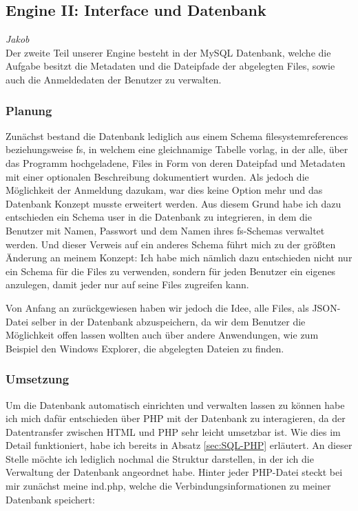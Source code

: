 \documentclass[12pt,a4paper,bibliography=totocnumbered,listof=totocnumbered]{scrartcl}
\begin{document}
\subsection{Engine II: Interface und Datenbank}
\emph{Jakob}\\
\label{sec:EngineII}
Der zweite Teil unserer Engine besteht in der MySQL Datenbank, welche die Aufgabe besitzt die Metadaten und die Dateipfade der abgelegten Files, sowie auch die Anmeldedaten der Benutzer zu verwalten.

\subsubsection{Planung}
\label{sec:EngineIIPlanung}
Zunächst bestand die Datenbank lediglich aus einem Schema \glqq filesystemreferences\grqq{} beziehungsweise \glqq fs\grqq{}, in welchem eine gleichnamige Tabelle vorlag, in der alle, über das Programm hochgeladene, Files in Form von deren Dateipfad und Metadaten mit einer optionalen Beschreibung dokumentiert wurden.
Als jedoch die Möglichkeit der Anmeldung dazukam, war dies keine Option mehr und das Datenbank Konzept musste erweitert werden.
Aus diesem Grund habe ich dazu entschieden ein Schema \glqq user\grqq{} in die Datenbank zu integrieren, in dem die Benutzer mit Namen, Passwort und dem Namen ihres \glqq fs-Schemas\grqq{} verwaltet werden.
Und dieser Verweis auf ein anderes Schema führt mich zu der größten Änderung an meinem Konzept:
Ich habe mich nämlich dazu entschieden nicht nur ein Schema für die Files zu verwenden, sondern für jeden Benutzer ein eigenes anzulegen, damit jeder nur auf seine Files zugreifen kann.

Von Anfang an zurückgewiesen haben wir jedoch die Idee, alle Files, als JSON-Datei selber in der Datenbank abzuspeichern, da wir dem Benutzer die Möglichkeit offen lassen wollten auch über andere Anwendungen, wie zum Beispiel den Windows Explorer, die abgelegten Dateien zu finden.

\subsubsection{Umsetzung}
Um die Datenbank automatisch einrichten und verwalten lassen zu können habe ich mich dafür entschieden über PHP mit der Datenbank zu interagieren, da der Datentransfer zwischen HTML und PHP sehr leicht umsetzbar ist.
Wie dies im Detail funktioniert, habe ich bereits in Absatz \ref{sec:SQL-PHP} erläutert.
An dieser Stelle möchte ich lediglich nochmal die Struktur darstellen, in der ich die Verwaltung der Datenbank angeordnet habe.
Hinter jeder PHP-Datei steckt bei mir zunächst meine \glqq ind.php\grqq, welche die Verbindungsinformationen zu meiner Datenbank speichert:
\end{document}
